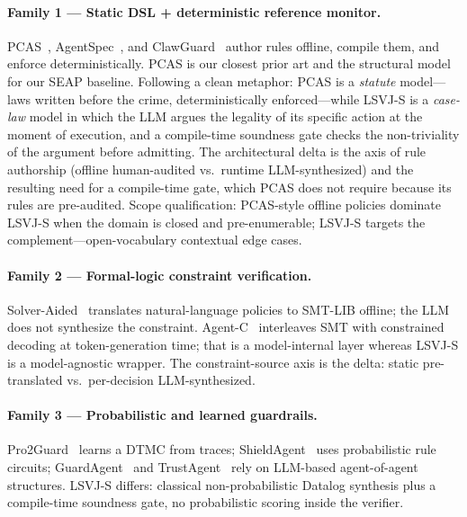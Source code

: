 \documentclass{article}
\theoremstyle{definition}
\begin{document}
\paragraph{Family 1 --- Static DSL + deterministic reference monitor.}
PCAS~\citep{palumbo2026pcas}, AgentSpec~\citep{wang2026agentspec}, and
ClawGuard~\citep{clawguard2026} author rules offline, compile them,
and enforce deterministically. PCAS is our closest prior art and the
structural model for our SEAP baseline. Following a clean metaphor:
PCAS is a \emph{statute} model---laws written before the crime,
deterministically enforced---while LSVJ-S is a \emph{case-law} model
in which the LLM argues the legality of its specific action at the
moment of execution, and a compile-time soundness gate checks the
non-triviality of the argument before admitting. The architectural
delta is the axis of rule authorship (offline human-audited vs.\
runtime LLM-synthesized) and the resulting need for a compile-time
gate, which PCAS does not require because its rules are pre-audited.
Scope qualification: PCAS-style offline policies dominate LSVJ-S when
the domain is closed and pre-enumerable; LSVJ-S targets the
complement---open-vocabulary contextual edge cases.

\paragraph{Family 2 --- Formal-logic constraint verification.}
Solver-Aided~\citep{roy2026solveraided} translates natural-language
policies to SMT-LIB offline; the LLM does not synthesize the
constraint. Agent-C~\citep{agentc2026} interleaves SMT with
constrained decoding at token-generation time; that is a
model-internal layer whereas LSVJ-S is a model-agnostic wrapper. The
constraint-source axis is the delta: static pre-translated vs.\
per-decision LLM-synthesized.

\paragraph{Family 3 --- Probabilistic and learned guardrails.}
Pro2Guard~\citep{he2025pro2guard} learns a DTMC from traces;
ShieldAgent~\citep{chen2025shieldagent} uses probabilistic rule
circuits; GuardAgent~\citep{xiang2024guardagent} and
TrustAgent~\citep{hua2024trustagent} rely on LLM-based agent-of-agent
structures. LSVJ-S differs: classical non-probabilistic Datalog
synthesis plus a compile-time soundness gate, no probabilistic scoring
inside the verifier.
\end{document}
